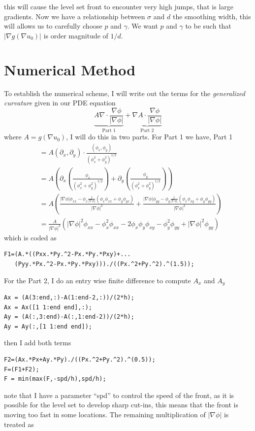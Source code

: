 \documentclass[margin=1in,12pt,3p]{elsarticle}
\begin{document}
this will cause the level set front to encounter very high jumps, that is large gradients. Now we have a relationship between $\sigma$ and $d$ the smoothing width, this will allows us to carefully choose $p$ and $\gamma$. We want $p$ and $\gamma$ to be such that $|\nabla g(\nabla u_0)|$ is order magnitude of $1/d$.
\section{Numerical Method} To establish the numerical scheme, I will write out the terms for the \textit{generalized curvature} given in our PDE equation
\[
\underbrace{A\nabla\cdot\frac{\nabla\phi}{|\nabla\phi|}}_{\textrm{Part 1}}+\underbrace{\nabla A\cdot\frac{\nabla\phi}{|\nabla\phi|}}_{\textrm{Part 2}}
\]
where $A = g(\nabla u_0)$, I will do this in two parts. For Part 1 we have, Part 1
\begin{align*}
    &=A(\partial_x,\partial_y)\cdot\frac{(\phi_x,\phi_y)}{(\phi_x^2+\phi_y^2)^{1/2}}\\[4pt]
    &=A\left(\partial_x\left(\frac{\phi_x}{(\phi_x^2+\phi_y^2)^{1/2}}\right)+\partial_y\left(\frac{\phi_y}{(\phi_x^2+\phi_y^2)^{1/2}}\right)\right)\\
    &=A\left(\frac{|\nabla\phi|\phi_{xx}-\phi_x\frac{1}{|\nabla\phi|}(\phi_x\phi_{xx}+\phi_y\phi_{yx})}{|\nabla\phi|^2}+\frac{|\nabla\phi|\phi_{yy}-\phi_y\frac{1}{|\nabla\phi|}(\phi_x\phi_{xy}+\phi_y\phi_{yy})}{|\nabla\phi|^2}\right)\\
    &=\frac{A}{|\nabla\phi|^3}\left(|\nabla\phi|^2\phi_{xx}-\phi_x^2\phi_{xx}-2\phi_x\phi_y\phi_{xy}-\phi_y^2\phi_{yy}+|\nabla\phi|^2\phi_{yy}\right)
\end{align*}
which is coded as
\begin{lstlisting}
F1=(A.*((Pxx.*Py.^2-Px.*Py.*Pxy)+...
   (Pyy.*Px.^2-Px.*Py.*Pxy)))./((Px.^2+Py.^2).^(1.5));
\end{lstlisting}
For the Part 2, I do an entry wise finite difference to compute $A_x$ and $A_y$
\begin{lstlisting}
Ax = (A(3:end,:)-A(1:end-2,:))/(2*h); 
Ax = Ax([1 1:end end],:);
Ay = (A(:,3:end)-A(:,1:end-2))/(2*h); 
Ay = Ay(:,[1 1:end end]);
\end{lstlisting}
then I add both terms
\begin{lstlisting}
F2=(Ax.*Px+Ay.*Py)./((Px.^2+Py.^2).^(0.5));
F=(F1+F2);
F = min(max(F,-spd/h),spd/h);
\end{lstlisting}
note that I have a parameter ``spd'' to control the speed of the front, as it is possible for the level set to develop sharp cut-ins, this means that the front is moving too fast in some locations. The remaining multiplication of $|\nabla\phi|$ is treated as
\end{document}
